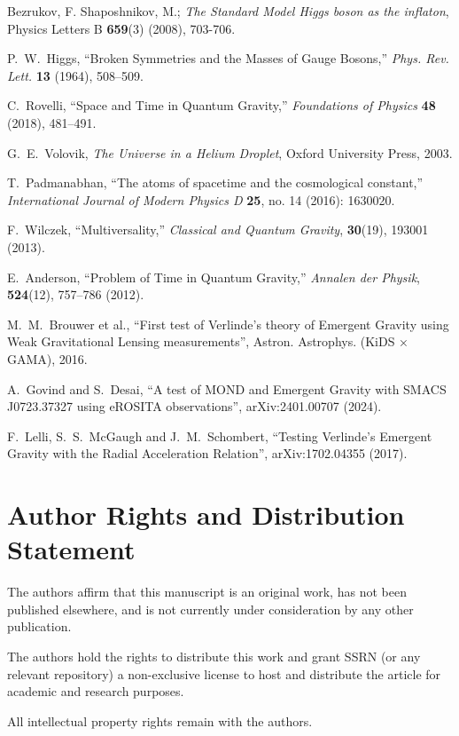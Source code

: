 \documentclass[twoside]{article}
\theoremstyle{definition}
\theoremstyle{remark}
\numberwithin{equation}{section}
\theoremstyle{definition}
\theoremstyle{example}
\theoremstyle{remark}
\numberwithin{equation}{section}%
\begin{document}
		\begin{thebibliography}{99}

			
			Bezrukov, F. Shaposhnikov, M.; \emph{The Standard Model Higgs boson as the inflaton}, Physics Letters B \textbf{659}(3) (2008), 703-706.
			
			
            P.~W.~Higgs, ``Broken Symmetries and the Masses of Gauge Bosons,'' \textit{Phys. Rev. Lett.} \textbf{13} (1964), 508–509.

            C.~Rovelli, ``Space and Time in Quantum Gravity,'' \textit{Foundations of Physics} \textbf{48} (2018), 481–491.

           G.~E.~Volovik, \textit{The Universe in a Helium Droplet}, Oxford University Press, 2003.
			
			T.~Padmanabhan, ``The atoms of spacetime and the cosmological constant,'' \textit{International Journal of Modern Physics D} \textbf{25}, no. 14 (2016): 1630020.
			
			F.~Wilczek, ``Multiversality,'' \textit{Classical and Quantum Gravity}, \textbf{30}(19), 193001 (2013).
			
			E.~Anderson, ``Problem of Time in Quantum Gravity,'' \textit{Annalen der Physik}, \textbf{524}(12), 757–786 (2012).
			
			M.~M.~Brouwer et al., ``First test of Verlinde’s theory of Emergent Gravity using Weak Gravitational Lensing measurements'', Astron. Astrophys. (KiDS × GAMA), 2016.
			
            A.~Govind and S.~Desai, ``A test of MOND and Emergent Gravity with SMACS J0723.37327 using eROSITA observations'', arXiv:2401.00707 (2024).
			
			F.~Lelli, S.~S.~McGaugh and J.~M.~Schombert, “Testing Verlinde’s Emergent Gravity with the Radial Acceleration Relation”, arXiv:1702.04355 (2017).
			
						
		\end{thebibliography}
\section*{Author Rights and Distribution Statement}
The authors affirm that this manuscript is an original work, has not been published elsewhere, and is not currently under consideration by any other publication. 

The authors hold the rights to distribute this work and grant SSRN (or any relevant repository) a non-exclusive license to host and distribute the article for academic and research purposes.

All intellectual property rights remain with the authors.			
		\label{end-art}
	
\end{document}
